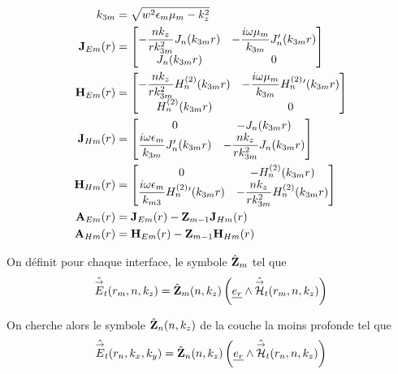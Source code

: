         \begin{align}
            k_{3m} &= \sqrt{w^2\epsilon_m\mu_m - k_z^2}
            \\
            \mathbf{J}_{Em}(r) &= 
                \begin{bmatrix}
                    -\dfrac{nk_z}{rk_{3m}^2}J_n(k_{3m}r) & -\dfrac{i\omega\mu_m}{k_{3m}}J_n'(k_{3m}r)
                    \\
                    J_n(k_{3m}r) & 0
                \end{bmatrix}
            \\
            \mathbf{H}_{Em}(r) &= 
                \begin{bmatrix}
                    -\dfrac{nk_z}{rk_{3m}^2}H_n^{(2)}(k_{3m}r) & -\dfrac{i\omega\mu_m}{k_{3m}}H_n^{(2)}{}'(k_{3m}r)
                    \\
                    H_n^{(2)}(k_{3m}r) & 0
                \end{bmatrix}
            \\
            \mathbf{J}_{Hm}(r) &= 
                \begin{bmatrix}
                    0 & -J_n(k_{3m}r)
                    \\
                    \dfrac{i\omega\epsilon_m}{k_{3m}}J_n'(k_{3m}r) & -\dfrac{nk_z}{rk_{3m}^2}J_n(k_{3m}r)
                \end{bmatrix}
            \\
            \mathbf{H}_{Hm}(r) &= 
                \begin{bmatrix}
                    0 & -H_n^{(2)}(k_{3m}r)
                    \\
                    \dfrac{i\omega\epsilon_m}{k_{m3}}H_n^{(2)}{}'(k_{3m}r) & -\dfrac{nk_z}{rk_{3m}^2}H_n^{(2)}(k_{3m}r)
                \end{bmatrix}
            \\
            \mathbf{A}_{Em}(r) &= \mathbf{J}_{Em}(r) -  \mathbf{Z}_{m-1} \mathbf{J}_{Hm}(r)
            \\
            \mathbf{A}_{Hm}(r) &= \mathbf{H}_{Em}(r) -  \mathbf{Z}_{m-1} \mathbf{H}_{Hm}(r)
        \end{align}


        On définit pour chaque interface, le symbole $\hat {\mathbf{Z}}_m$ tel que 
        \begin{equation}
            \hat {{\overset{\rightarrow}{E}}}_t(r_m,n,k_z) = \hat {\mathbf{Z}}_m(n,k_z) \left(\underline{e_r} \wedge \hat {{\overset{\rightarrow}{\mathcal{H}}}}_t(r_m,n,k_z)\right)
        \end{equation}

        On cherche alors le symbole $\hat {\mathbf{Z}}_n(n,k_z)$  de la couche la moins profonde tel que 
        \begin{equation}
            \hat {{\overset{\rightarrow}{E}}}_t(r_n,k_x,k_y) = \hat {\mathbf{Z}}_n (n,k_z) \left(\underline{e_r} \wedge \hat {{\overset{\rightarrow}{\mathcal{H}}}}_t(r_n,n,k_z)\right)
        \end{equation}

